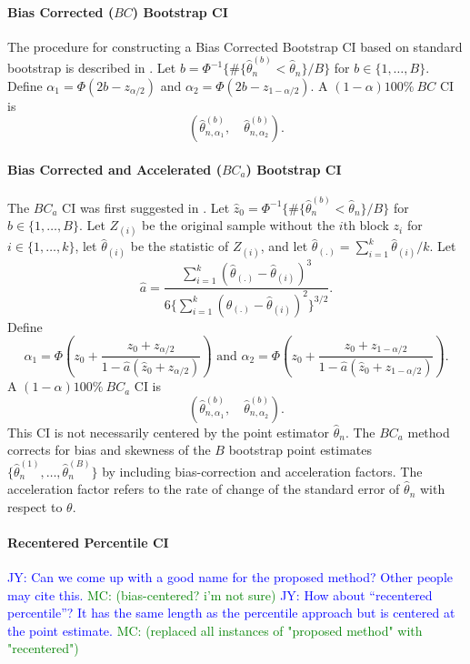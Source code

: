 \documentclass[12pt, letterpaper, titlepage]{article}
\newcommand{\jy}[1]{\textcolor{blue}{JY: #1}}
\newcommand{\mc}[1]{\textcolor{green}{MC: (#1)}}
\begin{document}
\paragraph{Bias Corrected ($BC$) Bootstrap CI}
The procedure for constructing a Bias Corrected Bootstrap CI based on standard
bootstrap is described in \citet{carpenter2000bootstrap}. Let
$b = \Phi^{-1}\{\#\{\hat\theta_n^{(b)} < \hat{\theta}_n\} / B\}$ for
$b \in \{1, \ldots, B\}$. Define $\alpha_1 = \Phi(2b - z_{\alpha/2})$ and 
$\alpha_2 = \Phi(2b - z_{1 - \alpha/2})$. A $(1 - \alpha)100\%~BC$ CI is
\[
(\hat\theta_{n, \alpha_1}^{(b)}, \quad \hat\theta_{n, \alpha_2}^{(b)}).
\]


\paragraph{Bias Corrected and Accelerated ($BC_a$) Bootstrap CI}
The $BC_a$ CI was first suggested in \citet{efron1987better}. Let
$\hat{z}_0 = \Phi^{-1}\{\#\{\hat\theta_n^{(b)} < \hat{\theta}_n\} / B\}$ for
$b \in \{1, \ldots, B\}$. Let $Z_{(i)}$ be the original sample without the
$i$th block $z_i$ for $i \in \{1, \ldots, k\}$, let $\hat{\theta}_{(i)}$ be
the statistic of $Z_{(i)}$, and let
$\hat{\theta}_{(.)} = \sum_{i=1}^{k} \hat{\theta}_{(i)} / k$. 
Let 
\[
\hat{a} = \frac{\sum_{i=1}^{k} (\hat{\theta}_{(.)} -
  \hat{\theta}_{(i)})^3}{6\{\sum_{i=1}^{k} (\hat{\theta}_{(.)} -
  \hat{\theta}_{(i)})^2\}^{3/2}}.
\]
Define
\[
\alpha_1 = \Phi\left(z_0 + \frac{z_{0} +
  z_{\alpha/2}}{1 - \hat{a}(\hat{z}_{0} + z_{\alpha/2})}\right)
\text{ and }
\alpha_2 = \Phi\left(z_0 + \frac{z_{0} +
  z_{1 - \alpha/2}}{1 - \hat{a}(\hat{z}_{0} + z_{1 - \alpha/2})}\right).
\]
A $(1 - \alpha)100\%~BC_a$ CI is
\[
(\hat\theta_{n, \alpha_1}^{(b)}, \quad \hat\theta_{n, \alpha_2}^{(b)}).
\]
This CI is not necessarily centered by the point estimator $\hat\theta_n$. The
$BC_a$ method corrects for bias and skewness of the $B$ bootstrap point
estimates $\{\hat\theta_n^{(1)}, \ldots, \hat\theta_n^{(B)}\}$ by including
bias-correction and acceleration factors. The acceleration factor refers to
the rate of change of the standard error of $\hat\theta_n$ with respect to
$\theta$.


\paragraph{Recentered Percentile CI}
\jy{Can we come up with a good name for the proposed method? Other people may
 cite this.} \mc{bias-centered? i'm not sure}
\jy{How about ``recentered percentile''? It has the same length as the
  percentile approach but is centered at the point estimate.} \mc{replaced
  all instances of "proposed
  method" with "recentered"}
\end{document}
